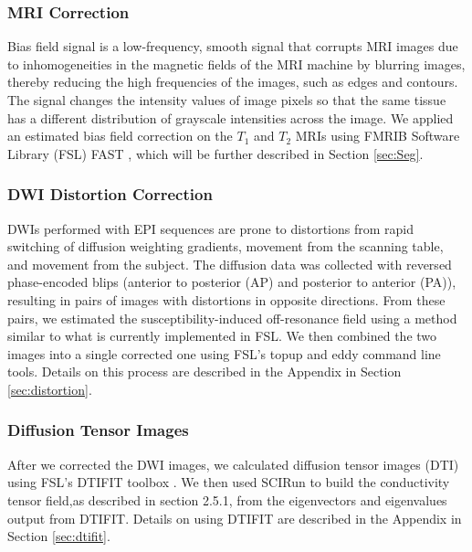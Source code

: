 \subsubsection{MRI Correction}

Bias field signal is a low-frequency, smooth signal that corrupts MRI images due to inhomogeneities in the magnetic fields of the MRI machine by blurring images, thereby reducing the high frequencies of the images, such as edges and contours. The signal changes the intensity values of image pixels so that the same tissue has a different distribution of grayscale intensities across the image. \cite{ref:bias} We applied an estimated bias field correction on the $T_1$ and $T_2$ MRIs using FMRIB Software Library (FSL) FAST \cite{ref:fslfast}, which will be further described in Section \ref{sec:Seg}.

\subsubsection{DWI Distortion Correction}

DWIs performed with EPI sequences are prone to distortions from rapid switching of diffusion weighting gradients, movement from the scanning table, and movement from the subject. The diffusion data was collected with reversed phase-encoded blips (anterior to posterior (AP) and posterior to anterior (PA)), resulting in pairs of images with distortions in opposite directions. From these pairs, we estimated the susceptibility-induced off-resonance field using a method \cite{ref:fsltopup1} similar to what is currently implemented in FSL.\cite{ref:fsltopup2} We then combined the two images into a single corrected one using FSL's topup and eddy command line tools. Details on this process are described in the Appendix in Section \ref{sec:distortion}.

\subsubsection{Diffusion Tensor Images}

After we corrected the DWI images, we calculated diffusion tensor images (DTI) using FSL's DTIFIT toolbox \cite{ref:dtifit}. We then used SCIRun \cite{ref:scirun} to build the conductivity tensor field,as described in section 2.5.1, from the eigenvectors and eigenvalues output from DTIFIT. Details on using DTIFIT are described in the Appendix in Section \ref{sec:dtifit}.


